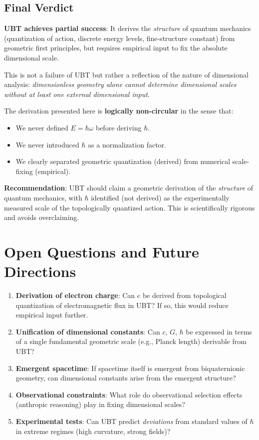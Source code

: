 \documentclass[12pt]{article}
\begin{document}
\subsection{Final Verdict}

\textbf{UBT achieves partial success}: It derives the \emph{structure} of quantum mechanics (quantization of action, discrete energy levels, fine-structure constant) from geometric first principles, but requires empirical input to fix the absolute dimensional scale.

This is not a failure of UBT but rather a reflection of the nature of dimensional analysis: \emph{dimensionless geometry alone cannot determine dimensional scales without at least one external dimensional input}.

The derivation presented here is \textbf{logically non-circular} in the sense that:
\begin{itemize}
\item We never defined $E = \hbar\omega$ before deriving $\hbar$.
\item We never introduced $\hbar$ as a normalization factor.
\item We clearly separated geometric quantization (derived) from numerical scale-fixing (empirical).
\end{itemize}

\textbf{Recommendation}: UBT should claim a geometric derivation of the \emph{structure} of quantum mechanics, with $\hbar$ identified (not derived) as the experimentally measured scale of the topologically quantized action. This is scientifically rigorous and avoids overclaiming.

\section{Open Questions and Future Directions}

\begin{enumerate}
\item \textbf{Derivation of electron charge}: Can $e$ be derived from topological quantization of electromagnetic flux in UBT? If so, this would reduce empirical input further.

\item \textbf{Unification of dimensional constants}: Can $c$, $G$, $\hbar$ be expressed in terms of a single fundamental geometric scale (e.g., Planck length) derivable from UBT?

\item \textbf{Emergent spacetime}: If spacetime itself is emergent from biquaternionic geometry, can dimensional constants arise from the emergent structure?

\item \textbf{Observational constraints}: What role do observational selection effects (anthropic reasoning) play in fixing dimensional scales?

\item \textbf{Experimental tests}: Can UBT predict \emph{deviations} from standard values of $\hbar$ in extreme regimes (high curvature, strong fields)?
\end{enumerate}
\end{document}

